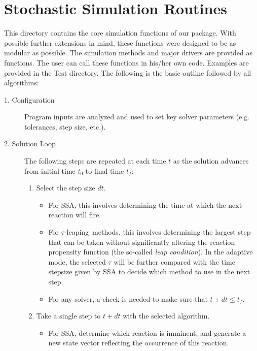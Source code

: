 \documentclass[12pt]{article}
\newcommand{\tauleaping}{$\tau$-leap\-ing}
\begin{document}
\section{Stochastic Simulation Routines} \label{routines}
This directory contains the core simulation functions of our package.
With possible further extensions in mind, these functions were designed to be
as modular  as possible.
The simulation methods and
major drivers are provided as functions. The user can call these functions
in his/her own code. Examples are provided in the Test directory. The following is
the basic outline followed by all algorithms:

\begin{description}
  \item[1.  Configuration] Program inputs are analyzed and used to
  set key solver parameters (e.g. tolerances, step size, etc.).

  \item[2.  Solution Loop]  The following steps are repeated at each time $t$
  as the solution advances from initial time $t_0$ to final time $t_f$:
  \begin{enumerate}

    \item Select the step size $dt$.
      \begin{itemize}
          \item  For SSA, this involves determining the time at which the next
        reaction will fire.

        \item For \tauleaping\ methods, this involves determining the
        largest step that can be taken without significantly altering
        the reaction propensity function (the so-called \emph{leap
        condition}). In the adaptive mode\cite{adaptive}, 
	the selected $\tau$ will be further 
	compared with the time stepsize given by SSA to decide which 
	method to use in the next step. 

        \item For any solver, a check is needed to make sure that $t +
        dt \le t_{f}$.

      \end{itemize}

    \item Take a single step to $t + dt$ with the selected algorithm.
      \begin{itemize}
        \item  For SSA, determine which reaction is imminent, and generate
              a new state vector reflecting the occurrence of this reaction.


\end{itemize}
\end{enumerate}
\end{description}
\end{document}

